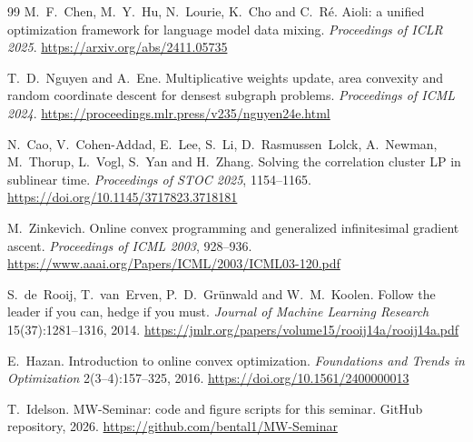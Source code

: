 \documentclass[11pt,a4paper]{article}
\theoremstyle{plain}
\theoremstyle{definition}
\begin{document}
\begin{thebibliography}{99}
 M.~F.~Chen, M.~Y.~Hu, N.~Lourie, K.~Cho and C.~R\'e. Aioli: a unified optimization framework for language model data mixing. \emph{Proceedings of ICLR 2025}. \url{https://arxiv.org/abs/2411.05735}

 T.~D.~Nguyen and A.~Ene. Multiplicative weights update, area convexity and random coordinate descent for densest subgraph problems. \emph{Proceedings of ICML 2024}. \url{https://proceedings.mlr.press/v235/nguyen24e.html}

 N.~Cao, V.~Cohen-Addad, E.~Lee, S.~Li, D.~Rasmussen~Lolck, A.~Newman, M.~Thorup, L.~Vogl, S.~Yan and H.~Zhang. Solving the correlation cluster LP in sublinear time. \emph{Proceedings of STOC 2025}, 1154--1165. \url{https://doi.org/10.1145/3717823.3718181}

 M.~Zinkevich. Online convex programming and generalized infinitesimal gradient ascent. \emph{Proceedings of ICML 2003}, 928--936. \url{https://www.aaai.org/Papers/ICML/2003/ICML03-120.pdf}

 S.~de~Rooij, T.~van~Erven, P.~D.~Gr\"unwald and W.~M.~Koolen. Follow the leader if you can, hedge if you must. \emph{Journal of Machine Learning Research} 15(37):1281--1316, 2014. \url{https://jmlr.org/papers/volume15/rooij14a/rooij14a.pdf}

 E.~Hazan. Introduction to online convex optimization. \emph{Foundations and Trends in Optimization} 2(3--4):157--325, 2016. \url{https://doi.org/10.1561/2400000013}

 T.~Idelson. MW-Seminar: code and figure scripts for this seminar. GitHub repository, 2026. \url{https://github.com/bental1/MW-Seminar}

\end{thebibliography}
\end{document}
